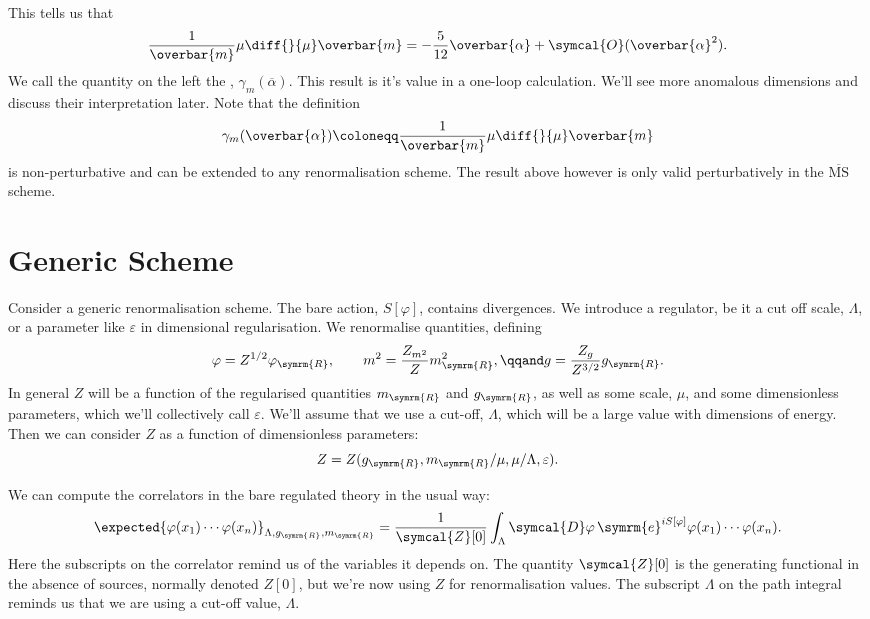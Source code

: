 \documentclass[fleqn]{NotesClass}
\newcommand*{\MSbar}{\ensuremath{\overline{\text{MS}}}}
\newcommand{\e}{\symrm{e}}
\newcommand{\order}{\symcal{O}}
\newcommand{\DL}[1]{\symcal{D}#1}
\newcommand{\renormalised}{\symrm{R}}
\begin{document}
    This tells us that
    \begin{equation}
        \frac{1}{\overbar{m}} \mu \diff{}{\mu} \overbar{m} = -\frac{5}{12}\overbar{\alpha} + \order(\overbar{\alpha}^2).
    \end{equation}
    We call the quantity on the left the , \(\gamma_m(\overbar{\alpha})\).
    This result is it's value in a one-loop calculation.
    We'll see more anomalous dimensions and discuss their interpretation later.
    Note that the definition
    \begin{equation}
        \gamma_m(\overbar{\alpha}) \coloneqq \frac{1}{\overbar{m}} \mu \diff{}{\mu} \overbar{m}
    \end{equation}
    is non-perturbative and can be extended to any renormalisation scheme.
    The result above however is only valid perturbatively in the \MSbar{} scheme.
    
    \section{Generic Scheme}
    Consider a generic renormalisation scheme.
    The bare action, \(S[\varphi]\), contains divergences.
    We introduce a regulator, be it a cut off scale, \(\Lambda\), or a parameter like \(\varepsilon\) in dimensional regularisation.
    We renormalise quantities, defining
    \begin{equation}
        \varphi = Z^{1/2}\varphi_{\renormalised}, \qquad m^2 = \frac{Z_{m^2}}{Z} m_{\renormalised}^2, \qqand g = \frac{Z_g}{Z^{3/2}} g_{\renormalised}.
    \end{equation}
    In general \(Z\) will be a function of the regularised quantities \(m_{\renormalised}\) and \(g_{\renormalised}\), as well as some scale, \(\mu\), and some dimensionless parameters, which we'll collectively call \(\varepsilon\).
    We'll assume that we use a cut-off, \(\Lambda\), which will be a large value with dimensions of energy.
    Then we can consider \(Z\) as a function of dimensionless parameters:
    \begin{equation}
        Z = Z(g_{\renormalised}, m_{\renormalised}/\mu, \mu/\Lambda, \varepsilon).
    \end{equation}
    
    We can compute the correlators in the bare regulated theory in the usual way:
    \begin{equation}
        \expected{\varphi(x_1) \dotsm \varphi(x_n)}_{\Lambda, g_{\renormalised}, m_{\renormalised}} = \frac{1}{\symcal{Z}[0]} \int_\Lambda \DL{\varphi} \, \e^{iS[\varphi]} \varphi(x_1) \dotsm \varphi(x_n).
    \end{equation}
    Here the subscripts on the correlator remind us of the variables it depends on.
    The quantity \(\symcal{Z}[0]\) is the generating functional in the absence of sources, normally denoted \(Z[0]\), but we're now using \(Z\) for renormalisation values.
    The subscript \(\Lambda\) on the path integral reminds us that we are using a cut-off value, \(\Lambda\).
    
\end{document}
